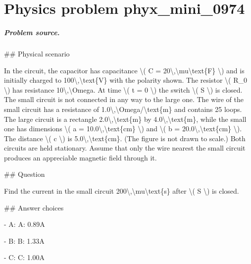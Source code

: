 
\chapter{Physics problem phyx\_mini\_0974}
\label{ch:PhyXMiniProblems_problem_phyx_mini_0974}

\paragraph{Problem source.}
\#\# Physical scenario

In the circuit, the capacitor has capacitance \textbackslash{}( C = 20\textbackslash{},\textbackslash{}mu\textbackslash{}text\{F\} \textbackslash{}) and is initially charged to 100\textbackslash{},\textbackslash{}text\{V\} with the polarity shown. The resistor \textbackslash{}( R\_0 \textbackslash{}) has resistance 10\textbackslash{},\textbackslash{}Omega. At time \textbackslash{}( t = 0 \textbackslash{}) the switch \textbackslash{}( S \textbackslash{}) is closed. The small circuit is not connected in any way to the large one. The wire of the small circuit has a resistance of 1.0\textbackslash{},\textbackslash{}Omega/\textbackslash{}text\{m\} and contains 25 loops. The large circuit is a rectangle 2.0\textbackslash{},\textbackslash{}text\{m\} by 4.0\textbackslash{},\textbackslash{}text\{m\}, while the small one has dimensions \textbackslash{}( a = 10.0\textbackslash{},\textbackslash{}text\{cm\} \textbackslash{}) and \textbackslash{}( b = 20.0\textbackslash{},\textbackslash{}text\{cm\} \textbackslash{}). The distance \textbackslash{}( c \textbackslash{}) is 5.0\textbackslash{},\textbackslash{}text\{cm\}. (The figure is not drawn to scale.) Both circuits are held stationary. Assume that only the wire nearest the small circuit produces an appreciable magnetic field through it.

\#\# Question

Find the current in the small circuit 200\textbackslash{},\textbackslash{}mu\textbackslash{}text\{s\} after \textbackslash{}( S \textbackslash{}) is closed.

\#\# Answer choices

- A: A: 0.89A

- B: B: 1.33A

- C: C: 1.00A

